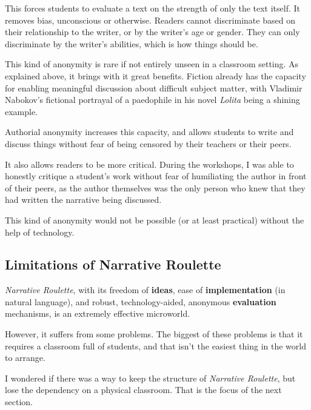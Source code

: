 This forces students to evaluate a text on the strength of only the text
itself. It removes bias, unconscious or otherwise. Readers cannot
discriminate based on their relationship to the writer, or by the
writer's age or gender. They can only discriminate by the writer's
abilities, which is how things should be.

This kind of anonymity is rare if not entirely unseen in a classroom
setting. As explained above, it brings with it great benefits. Fiction
already has the capacity for enabling meaningful discussion about difficult subject matter, with Vladimir Nabokov's fictional portrayal of a paedophile in his novel \emph{Lolita} being a shining example.

Authorial anonymity increases this capacity, and allows students to
write and discuss things without fear of being censored by their teachers or their
peers.

It also allows readers to be more critical. During the workshops, I was able to honestly critique a student's work without fear of humiliating the author in front of their peers, as the author themselves was the only person who knew that they had written the narrative being discussed.

This kind of anonymity would not be possible (or at least practical)
without the help of technology.

\subsection{Limitations of Narrative Roulette}

\emph{Narrative Roulette}, with its freedom of \textbf{ideas}, ease of \textbf{implementation} (in natural language), and robust, technology-aided, anonymous \textbf{evaluation} mechanisms, is an extremely effective microworld. 

However, it suffers from some problems. The biggest of these problems is that it requires a classroom full of students, and that isn't the easiest thing in the world to arrange. 

I wondered if there was a way to keep the structure of \emph{Narrative Roulette}, but lose the dependency on a physical classroom. That is the focus of the next section.   
